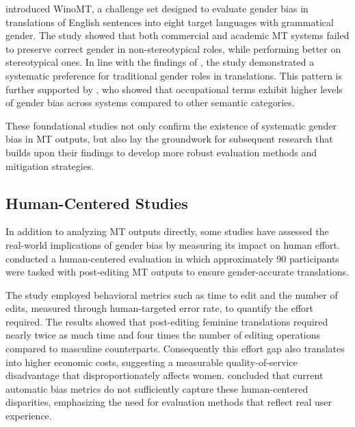 \textbf{\citet{stanovskyEvaluatingGenderBias2019}} introduced WinoMT, a challenge set designed to evaluate gender bias in translations of English sentences into eight target languages with grammatical gender. The study showed that both commercial and academic MT systems failed to preserve correct gender in non-stereotypical roles, while performing better on stereotypical ones. In line with the findings of \citeauthor{pratesAssessingGenderBias2019}, the study demonstrated a systematic preference for traditional gender roles in translations. This pattern is further supported by \textbf{\citet{choMeasuringGenderBias2019}}, who showed that occupational terms exhibit higher levels of gender bias across systems compared to other semantic categories. 

These foundational studies not only confirm the existence of systematic gender bias in MT outputs, but also lay the groundwork for subsequent research that builds upon their findings to develop more robust evaluation methods and mitigation strategies.

\subsection{Human-Centered Studies}
In addition to analyzing MT outputs directly, some studies have assessed the real-world implications of gender bias by measuring its impact on human effort. \citet{savoldiWhatHarmQuantifying2024} conducted a human-centered evaluation in which approximately 90 participants were tasked with post-editing MT outputs to ensure gender-accurate translations.

The study employed behavioral metrics such as time to edit and the number of edits, measured through human-targeted error rate, to quantify the effort required. The results showed that post-editing feminine translations required nearly twice as much time and four times the number of editing operations compared to masculine counterparts. Consequently this effort gap also translates into higher economic costs, suggesting a measurable quality-of-service disadvantage that disproportionately affects women. \citeauthor{savoldiWhatHarmQuantifying2024} concluded that current automatic bias metrics do not sufficiently capture these human-centered disparities, emphasizing the need for evaluation methods that reflect real user experience.

